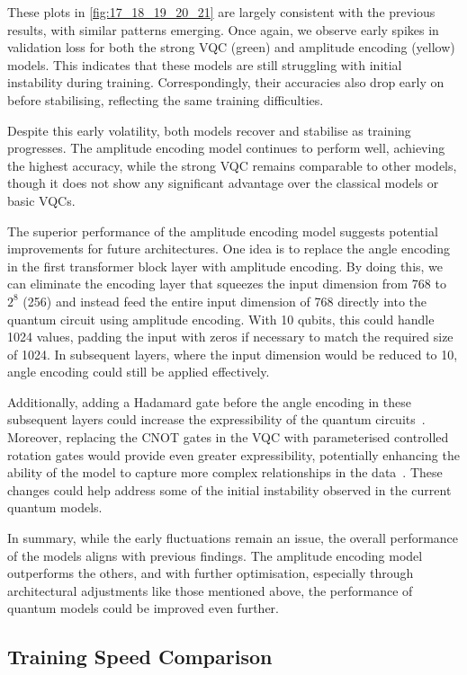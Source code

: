 These plots in \autoref{fig:17_18_19_20_21} are largely consistent
with the previous results, with similar patterns emerging. Once
again, we observe early spikes in validation loss for both the strong
VQC (green) and amplitude encoding (yellow) models. This indicates
that these models are still struggling with initial instability
during training. Correspondingly, their accuracies also drop early on
before stabilising, reflecting the same training difficulties.

Despite this early volatility, both models recover and stabilise as
training progresses. The amplitude encoding model continues to
perform well, achieving the highest accuracy, while the strong VQC
remains comparable to other models, though it does not show any
significant advantage over the classical models or basic VQCs.

The superior performance of the amplitude encoding model suggests
potential improvements for future architectures. One idea is to
replace the angle encoding in the first transformer block layer with
amplitude encoding. By doing this, we can eliminate the encoding
layer that squeezes the input dimension from 768 to
\(2^8\) (256) and instead feed the entire input dimension of 768
directly into the quantum circuit using amplitude encoding. With 10
qubits, this could handle 1024 values, padding the input with zeros
if necessary to match the required size of 1024. In subsequent
layers, where the input dimension would be reduced to 10, angle
encoding could still be applied effectively.

Additionally, adding a Hadamard gate before the angle encoding in
these subsequent layers could increase the expressibility of the
quantum circuits~\cite{Sim_2019}. Moreover, replacing the CNOT
gates in the VQC with
parameterised controlled rotation gates would provide even greater
expressibility, potentially enhancing the ability of the model to capture
more complex relationships in the data~\cite{chu2022qmlp}. These
changes could help
address some of the initial instability observed in the current quantum models.

In summary, while the early fluctuations remain an issue, the overall
performance of the models aligns with previous findings. The
amplitude encoding model outperforms the others, and with further
optimisation, especially through architectural adjustments like those
mentioned above, the performance of quantum models could be improved
even further.

\subsection{Training Speed Comparison}
\label{subsec:training_speed_comparison}

